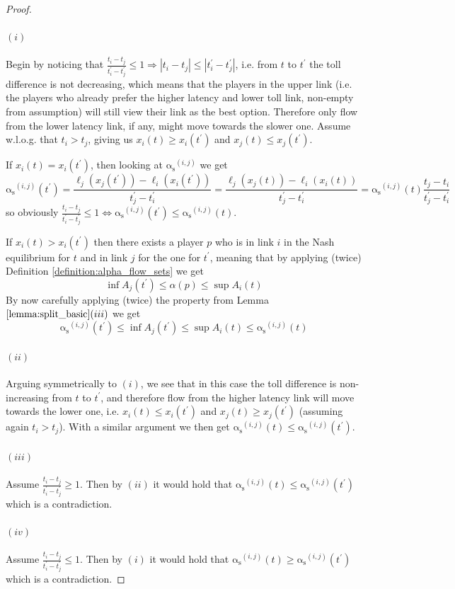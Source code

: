 \documentclass[10pt,a4paper]{book}
\newcommand{\as}{\mathrm{\alpha_s}}
\theoremstyle{definition}
\theoremstyle{comment}
\begin{document}
\begin{proof}
	$ $
	\paragraph{$(i)$}
	Begin by noticing that $\frac{t_i - t_j}{t_i^\prime - t_j^\prime} \le 1 \Rightarrow |t_i - t_j| \le |t_i^\prime - t_j^\prime|$, i.e. from $t$ to $t^\prime$ the toll difference is not decreasing, which means that the players in the upper link (i.e. the players who already prefer the higher latency and lower toll link, non-empty from assumption) will still view their link as the best option.
	Therefore only flow from the lower latency link, if any, might move towards the slower one.
	Assume w.l.o.g. that $t_i > t_j$, giving us $x_i(t) \ge x_i(t^\prime)$ and $x_j(t) \le x_j(t^\prime)$.

	If $x_i(t) = x_i(t^\prime)$, then looking at $\as^{(i, j)}$ we get
	\[\as^{(i, j)}(t^\prime) = \frac{\ell_j(x_j(t^\prime)) - \ell_i(x_i(t^\prime))}{t_j^\prime - t_i^\prime} = \frac{\ell_j(x_j(t)) - \ell_i(x_i(t))}{t_j^\prime - t_i^\prime} = \as^{(i, j)}(t) \frac{t_j - t_i}{t_j^\prime - t_i^\prime}\]
	so obviously $\frac{t_i - t_j}{t_i^\prime - t_j^\prime} \le 1 \Leftrightarrow \as^{(i, j)}(t^\prime) \le \as^{(i, j)}(t)$.

	If $x_i(t) > x_i(t^\prime)$ then there exists a player $p$ who is in link $i$ in the Nash equilibrium for $t$ and in link $j$ for the one for $t^\prime$, meaning that by applying (twice) Definition \ref{definition:alpha_flow_sets} we get
	\[\inf A_j(t^\prime) \le \alpha(p) \le \sup A_i(t)\]
	By now carefully applying  (twice) the property from Lemma $\ref{lemma:split_basic}(iii)$ we get
	\[\as^{(i, j)}(t^\prime) \le \inf A_j(t^\prime) \le \sup A_i(t) \le \as^{(i, j)}(t)\]

	\paragraph{$(ii)$}
	Arguing symmetrically to $(i)$, we see that in this case the toll difference is non-increasing from $t$ to $t^\prime$, and therefore flow from the higher latency link will move towards the lower one, i.e. $x_i(t) \le x_i(t^\prime)$ and $x_j(t) \ge x_j(t^\prime)$ (assuming again $t_i > t_j$).
	With a similar argument we then get $\as^{(i, j)}(t) \le \as^{(i, j)}(t^\prime)$.

	\paragraph{$(iii)$}
	Assume $\frac{t_i - t_j}{t_i^\prime - t_j^\prime} \ge 1$.
	Then by $(ii)$ it would hold that $\as^{(i, j)}(t) \le \as^{(i, j)}(t^\prime)$ which is a contradiction.

	\paragraph{$(iv)$}
	Assume $\frac{t_i - t_j}{t_i^\prime - t_j^\prime} \le 1$.
	Then by $(i)$ it would hold that $\as^{(i, j)}(t) \ge \as^{(i, j)}(t^\prime)$ which is a contradiction.
\end{proof}
\end{document}
